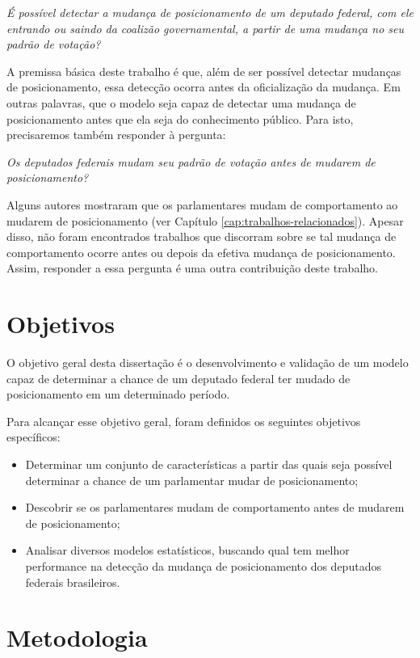 \emph{É possível detectar a mudança de posicionamento de um deputado federal,
com ele entrando ou saindo da coalizão governamental, a partir de uma mudança
no seu padrão de votação?}

A premissa básica deste trabalho é que, além de ser possível detectar mudanças
de posicionamento, essa detecção ocorra antes da oficialização da mudança. Em
outras palavras, que o modelo seja capaz de detectar uma mudança de
posicionamento antes que ela seja do conhecimento público. Para isto,
precisaremos também responder à pergunta:

\emph{Os deputados federais mudam seu padrão de votação antes de mudarem de
posicionamento?}

Alguns autores mostraram que os parlamentares mudam de comportamento ao mudarem
de posicionamento (ver Capítulo \ref{cap:trabalhos-relacionados}). Apesar
disso, não foram encontrados trabalhos que discorram sobre se tal mudança de
comportamento ocorre antes ou depois da efetiva mudança de posicionamento.
Assim, responder a essa pergunta é uma outra contribuição deste trabalho.

\section{Objetivos}

O objetivo geral desta dissertação é o desenvolvimento e validação de um modelo
capaz de determinar a chance de um deputado federal ter mudado de
posicionamento em um determinado período.

Para alcançar esse objetivo geral, foram definidos os seguintes objetivos
específicos:

\begin{itemize}
  \item Determinar um conjunto de características a partir das quais seja
    possível determinar a chance de um parlamentar mudar de posicionamento;
  \item Descobrir se os parlamentares mudam de comportamento antes de mudarem
    de posicionamento;
  \item Analisar diversos modelos estatísticos, buscando qual tem melhor
    performance na detecção da mudança de posicionamento dos deputados
    federais brasileiros.
\end{itemize}

\section{Metodologia}

